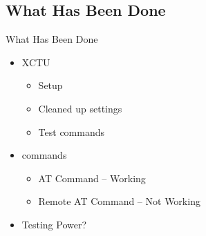 \documentclass{beamer}
\begin{document}

\subsection{What Has Been Done}
\begin{frame}{What Has Been Done}
    \begin{itemize}
    \item
    XCTU
    \begin{itemize}
        \item Setup
        \item Cleaned up settings
        \item Test commands
    \end{itemize}
    \item commands
    \begin{itemize}
        \item AT Command -- Working
        \item Remote AT Command -- Not Working
    \end{itemize}
    \item Testing Power?
    \end{itemize}
\end{frame}








  
\end{document}
